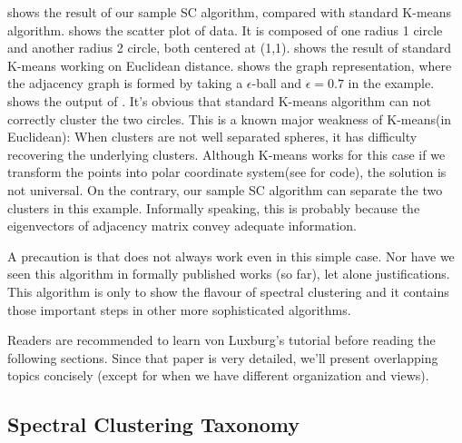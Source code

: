 \rfig{\ref{fig:ssc_demo}} shows the result of our sample SC algorithm, 
compared with standard K-means algorithm. 
\rfig{\ref{fig:ssc_data}} shows the scatter plot of data. 
It is composed of one radius 1 circle and another radius 2 circle, 
both centered at (1,1). 
\rfig{\ref{fig:ssc_kmeans}} shows the result of standard K-means
working on Euclidean distance. 
\rfig{\ref{fig:ssc_adj}} shows the graph representation, where 
the adjacency graph is formed by taking a $\epsilon$-ball and 
$\epsilon=0.7$ in the example. 
\rfig{\ref{fig:ssc_sc}} shows the output of \ralg{\ref{alg:sc_sample}}. 
It's obvious that standard K-means algorithm can not correctly cluster 
the two circles. This is a known major weakness of K-means(in Euclidean): 
When clusters are not well separated spheres, it has difficulty recovering 
the underlying clusters. Although K-means works for this case 
if we transform the points 
into polar coordinate system(see \cite{hu2012-spectral2hop} for code), 
the solution is not universal. On the contrary, our sample SC 
algorithm can separate the two clusters in this example. 
Informally speaking, this is 
probably because the eigenvectors
of adjacency matrix convey adequate information. 

A precaution is that \ralg{\ref{alg:sc_sample}} does not always work even 
in this simple case. Nor have we seen this algorithm in formally published works
(so far), let alone justifications. This algorithm is only to show the flavour 
of spectral clustering and it contains those important steps in other
more sophisticated algorithms. 

Readers are recommended to learn 
von Luxburg's tutorial\cite{von2007tutorial} before reading the following sections. 
Since that paper is very detailed, we'll present overlapping topics 
concisely (except for when we have different organization and views). 


\subsection{Spectral Clustering Taxonomy}
\label{sec:taxonomy}

